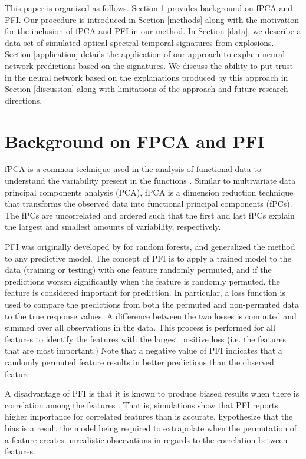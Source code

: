 \documentclass[letterpaper]{article}
\begin{document}
This paper is organized as follows. Section \ref{background} provides background on fPCA and PFI. Our procedure is introduced in Section \ref{methods} along with the motivation for the inclusion of fPCA and PFI in our method. In Section \ref{data}, we describe a data set of simulated optical spectral-temporal signatures from explosions. Section \ref{application} details the application of our approach to explain neural network predictions based on the signatures. We discuss the ability to put trust in the neural network based on the explanations produced by this approach in Section \ref{discussion} along with limitations of the approach and future research directions.

\section{Background on FPCA and PFI} \label{background}

fPCA is a common technique used in the analysis of functional data to understand the variability present in the functions \cite{ramsay:2005,wang:2016}. Similar to multivariate data principal components analysis (PCA), fPCA is a dimension reduction technique that transforms the observed data into functional principal components (fPCs). The fPCs are uncorrelated and ordered such that the first and last fPCs explain the largest and smallest amounts of variability, respectively.

PFI was originally developed by \citeauthor{breiman:2001}  for random forests, and \citeauthor{fisher:2019}  generalized the method to any predictive model. The concept of PFI is to apply a trained model to the data (training or testing) with one feature randomly permuted, and if the predictions worsen significantly when the feature is randomly permuted, the feature is considered important for prediction. In particular, a loss function is used to compare the predictions from both the permuted and non-permuted data to the true response values. A difference between the two losses is computed and summed over all observations in the data. This process is performed for all features to identify the features with the largest positive loss (i.e. the features that are most important.) Note that a negative value of PFI indicates that a randomly permuted feature results in better predictions than the observed feature.

A disadvantage of PFI is that it is known to produce biased results when there is correlation among the features \cite{hooker:2019,nicodemus:2010,strobl:2007}. That is, simulations show that PFI reports higher importance for correlated features than is accurate. \citeauthor{hooker:2019}  hypothesize that the bias is a result the model being required to extrapolate when the permutation of a feature creates unrealistic observations in regards to the correlation between features.
\end{document}
